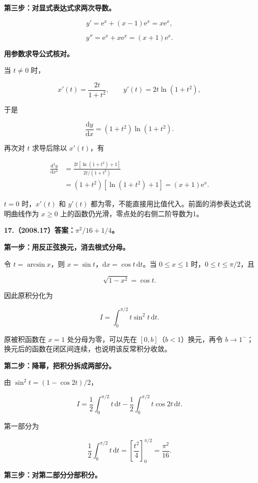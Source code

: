 \documentclass[UTF8,11pt,fontset=windows]{ctexart}
\begin{document}
\textbf{第三步：对显式表达式求两次导数。}

$$
y'=\mathrm e^x+(x-1)\mathrm e^x=x\mathrm e^x,
$$

$$
\boxed{y''=\mathrm e^x+x\mathrm e^x=(x+1)\mathrm e^x}.
$$

\textbf{用参数求导公式核对。}

当 $t\ne0$ 时，

$$
x'(t)=\frac{2t}{1+t^2},
\qquad y'(t)=2t\ln(1+t^2),
$$

于是

$$
\frac{\mathrm dy}{\mathrm dx}=(1+t^2)\ln(1+t^2).
$$

再次对 $t$ 求导后除以 $x'(t)$，有

$$
\begin{aligned}
\frac{\mathrm d^2y}{\mathrm dx^2}
&=\frac{2t[\ln(1+t^2)+1]}{2t/(1+t^2)}\\
&=(1+t^2)[\ln(1+t^2)+1]=(x+1)\mathrm e^x.
\end{aligned}
$$

$t=0$ 时，$x'(t)$ 和 $y'(t)$ 都为零，不能直接用比值代入。前面的消参表达式说明曲线作为 $x\ge0$ 上的函数仍光滑，零点处的右侧二阶导数为1。

\clearpage

\textbf{17.（2008.17）答案：$\pi^2/16+1/4$。}

\textbf{第一步：用反正弦换元，消去根式分母。}

令 $t=\arcsin x$，则 $x=\sin t$，$\mathrm dx=\cos t\,\mathrm dt$。当 $0\le x\le1$ 时，$0\le t\le\pi/2$，且

$$
\sqrt{1-x^2}=\cos t.
$$

因此原积分化为

$$
I=\int_0^{\pi/2}t\sin^2t\,\mathrm dt.
$$

原被积函数在 $x=1$ 处分母为零，可以先在 $[0,b]$（$b<1$）换元，再令 $b\to1^-$；换元后的函数在闭区间连续，也说明该反常积分收敛。

\textbf{第二步：降幂，把积分拆成两部分。}

由 $\sin^2t=(1-\cos2t)/2$，

$$
I=\frac12\int_0^{\pi/2}t\,\mathrm dt
-\frac12\int_0^{\pi/2}t\cos2t\,\mathrm dt.
$$

第一部分为

$$
\frac12\int_0^{\pi/2}t\,\mathrm dt
=\left[\frac{t^2}{4}\right]_0^{\pi/2}
=\frac{\pi^2}{16}.
$$

\textbf{第三步：对第二部分分部积分。}
\end{document}
